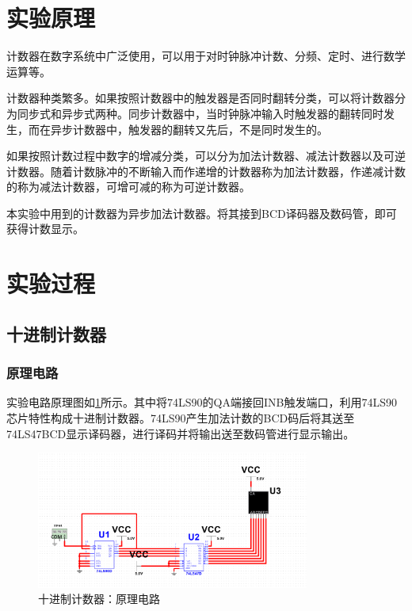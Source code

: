 \documentclass[UTF8]{ctexart}
\numberwithin{figure}{subsection}
\numberwithin{table}{subsection}
\numberwithin{equation}{subsection}
\begin{document}
\section{实验原理}
\par 计数器在数字系统中广泛使用，可以用于对时钟脉冲计数、分频、定时、进行数学运算等。
\par 计数器种类繁多。如果按照计数器中的触发器是否同时翻转分类，可以将计数器分为同步式和异步式两种。同步计数器中，当时钟脉冲输入时触发器的翻转同时发生，而在异步计数器中，触发器的翻转又先后，不是同时发生的。
\par 如果按照计数过程中数字的增减分类，可以分为加法计数器、减法计数器以及可逆计数器。随着计数脉冲的不断输入而作递增的计数器称为加法计数器，作递减计数的称为减法计数器，可增可减的称为可逆计数器。
\par 本实验中用到的计数器为异步加法计数器。将其接到BCD译码器及数码管，即可获得计数显示。

\section{实验过程}
\subsection{十进制计数器}
\subsubsection{原理电路}
\par 实验电路原理图如\ref{10 theory cir}所示。其中将74LS90的QA端接回INB触发端口，利用74LS90芯片特性构成十进制计数器。74LS90产生加法计数的BCD码后将其送至74LS47BCD显示译码器，进行译码并将输出送至数码管进行显示输出。

\begin{figure}[H]
    \begin{center}
        \includegraphics[width=0.8\textwidth]{design/10 circuit.png}
    \end{center}
    \caption{十进制计数器：原理电路}
    \label{10 theory cir}
\end{figure}
\end{document}
